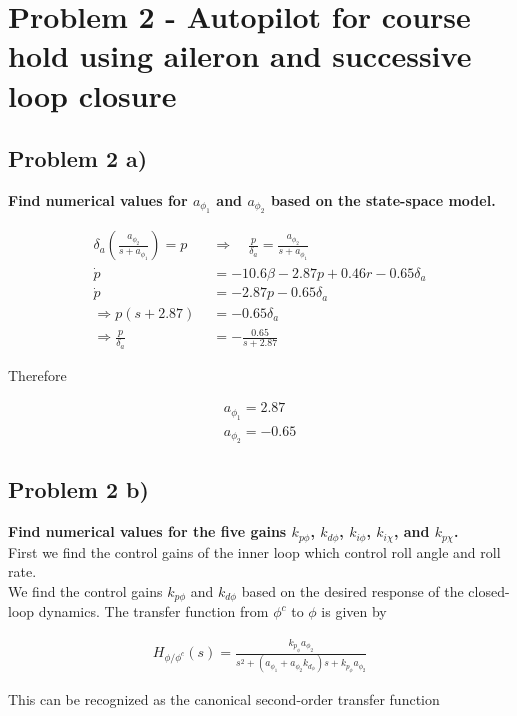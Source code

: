 \section*{Problem 2 - Autopilot for course hold using aileron and successive loop closure}
\subsection*{Problem 2 a)}
\textbf{Find numerical values for $a_{\phi_1}$
and $a_{\phi_2}$ based on the state-space model.}


\begin{align}
    \delta_a\left(\frac{a_{\phi_2}}{s+a_{\phi_1}}\right) = p \quad &\Rightarrow \quad \frac{p}{\delta_a} = \frac{a_{\phi_2}}{s+a_{\phi_1}} \\
    \dot{p} &= -10.6\beta - 2.87p + 0.46r -0.65\delta_a \\
    \dot{p} &= -2.87p - 0.65\delta_a \\
    \Rightarrow p(s+2.87) &= -0.65\delta_a \\
    \Rightarrow \frac{p}{\delta_a} &= -\frac{0.65}{s+2.87}
\end{align}

Therefore

\begin{align}
    a_{\phi_1} = 2.87 \\
    a_{\phi_2} = -0.65 
\end{align}

\subsection*{Problem 2 b)}

\textbf{Find numerical values for the five gains $k_{p\phi}$, $k_{d\phi}$, $k_{i\phi}$, $k_{i\chi}$, and $k_{p\chi}$.} \\

First we find the control gains of the inner loop which control roll angle and roll rate. \\
We find the control gains $k_{p\phi}$ and $k_{d\phi}$ based on the desired response of the closed-loop dynamics. The transfer function from $\phi^c$ to $\phi$ is given by

\begin{align}
    H_{\phi/\phi^c}(s) = \frac{k_{p_\phi}a_{\phi_2}}{s^2 + (a_{\phi_1} + a_{\phi_2}k_{d_\phi})s + k_{p_\phi}a_{\phi_2}}
\end{align}

This can be recognized as the canonical second-order transfer function 

